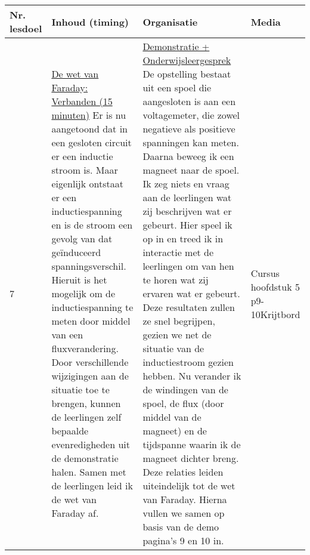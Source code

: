 \begin{landscape}
\begin{tabularx}{1.56\textwidth}{|p{1.5cm}|p{9cm}|X|p{4cm}|}
	\hline
	\textbf{Nr. lesdoel } & \textbf{Inhoud (timing)}  & \textbf{Organisatie } & \textbf{Media } \\ \hline
	7\newline\newline 8& \underline{De wet van Faraday:} \underline{Verbanden (15 minuten)}\newline
	Er is nu aangetoond dat in een gesloten circuit er een inductie stroom is. Maar eigenlijk ontstaat er een inductiespanning en is de stroom een gevolg van dat geïnduceerd spanningsverschil. Hieruit is het mogelijk om de inductiespanning te meten door middel van een fluxverandering. Door verschillende wijzigingen aan de situatie toe te brengen, kunnen de leerlingen zelf bepaalde evenredigheden uit de demonstratie halen. Samen met de leerlingen leid ik de wet van Faraday af.
	&  \underline{Demonstratie + Onderwijsleergesprek}\newline 
	De opstelling bestaat uit een spoel die aangesloten is aan een voltagemeter, die zowel negatieve als positieve spanningen kan meten. Daarna beweeg ik een magneet naar de spoel. Ik zeg niets en vraag aan de leerlingen wat zij beschrijven wat er gebeurt. Hier speel ik op in en treed ik in interactie met de leerlingen om van hen te horen wat zij ervaren wat er gebeurt.	Deze resultaten zullen ze snel begrijpen, gezien we net de situatie van de inductiestroom gezien hebben. Nu verander ik de windingen van de spoel, de flux (door middel van de magneet) en de tijdspanne waarin ik de magneet dichter breng. Deze relaties leiden uiteindelijk tot de wet van Faraday. Hierna vullen we samen op basis van de demo pagina's 9 en 10 in. 
	&  Cursus hoofdstuk 5 p9-10\newline\newline Krijtbord
	\\ \hline
\end{tabularx}\vspace{5mm}



\end{landscape}
